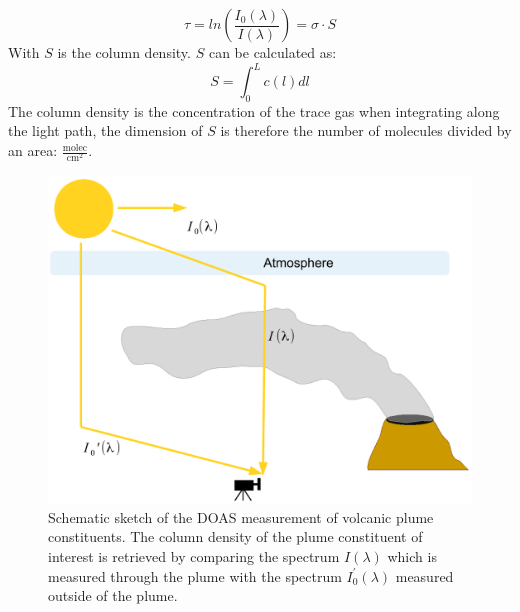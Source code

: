 \documentclass  [
  paper    = a4,
  BCOR     = 10mm,
  twoside,
  fontsize = 12pt,
  fleqn,
  toc      = bibnumbered,
  toc      = listofnumbered,
  numbers  = noendperiod,
  headings = normal,
  listof   = leveldown,
  version  = 3.03
]                                       {scrreprt}
\begin{document}
	\begin{equation}
	\tau = ln\left(\frac{I_{0}\left(\lambda\right)}{I\left(\lambda\right)}\right) = \sigma\cdot S
	\end{equation}
	With $S$ is the column density. $S$ can be calculated as:
	\begin{equation}
	S = \int_{0}^{L}c\left(l\right)dl
	\end{equation}
	The column density is the concentration of the trace gas when integrating along the light path, the dimension of $S$ is therefore the number of molecules divided by an area: $\frac{\text{molec}}{\text{cm}^2}$.\\
	\begin{figure}
		\centering
		\includegraphics[width=0.7\linewidth]{Bilder/DOASFunction}
		\caption[Schematic sketch of the DOAS measurement of volcanic plume constituents.]{Schematic sketch of the DOAS measurement of volcanic plume constituents. The column density of the plume constituent of interest is retrieved by comparing the spectrum $I\left(\lambda \right)$ which is measured through the plume with the spectrum  $I_0^{'}\left(\lambda \right)$ measured outside of the plume.}
		\label{fig:doasfunction}
	\end{figure}
	
\end{document}

